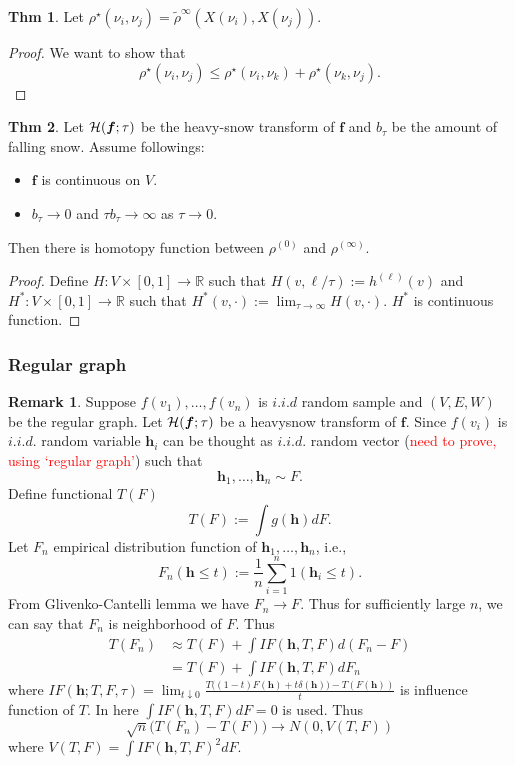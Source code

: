 \documentclass[preprint, review, 12pt]{article}
\theoremstyle{definition}
\newtheorem{thm}{Thm}[section]
\newtheorem{rmk}{Remark}[section]
\theoremstyle{remark}
\begin{document}
\begin{thm} 
Let $\rho^{\star}(\nu_i,\nu_j)=\tilde \rho^{\infty}(X(\nu_i),X(\nu_j)).$ 
\end{thm}
\begin{proof}
We want to show that 
\[
\rho^{\star}(\nu_i,\nu_j)\leq \rho^{\star}(\nu_i,\nu_k)+\rho^{\star}(\nu_k,\nu_j).
\]
\end{proof}

\begin{thm}
Let ${\cal H}({\boldsymbol f};\tau)$ be the heavy-snow transform of ${\boldsymbol f}$ and $b_{\tau}$ be the amount of falling snow. Assume followings:
\begin{itemize}
	\item ${\boldsymbol f}$ is continuous on $V$. 
	\item $b_{\tau} \to 0$ and $\tau b_\tau \to \infty$ as $\tau \to 0$.
\end{itemize}
Then there is homotopy function between $\rho^{(0)}$ and $\rho^{(\infty)}$. 
\end{thm}
\begin{proof}
Define $H:V \times [0,1] \to \mathbb{R}$ such that $H(v,\ell/\tau):=h^{(\ell)}(v)$ and $H^*:V \times [0,1] \to \mathbb{R}$ such that $H^*(v,\cdot):=\lim_{\tau \to \infty} H(v,\cdot)$. $H^*$ is continuous function. 
\end{proof}
\subsubsection{Regular graph}
\begin{rmk}
Suppose $f(v_1),\dots,f(v_n)$ is $i.i.d$ random sample and $(V,E,W)$ be the regular graph. Let ${\cal H}(\boldsymbol{f};\tau)$ be a heavysnow transform of ${\boldsymbol f}$. Since $f(v_i)$ is $i.i.d.$ random variable ${\boldsymbol h}_i$ can be thought as $i.i.d.$ random vector (\textcolor{red}{need to prove, using `regular graph'}) such that 
\[
{\boldsymbol h}_1,\dots,{\boldsymbol h}_n \sim F.
\] 
Define functional $T(F)$
\[
T(F):=\int g({\boldsymbol h}) dF.
\]
Let $F_n$ empirical distribution function of ${\boldsymbol h}_1,\dots,{\boldsymbol h}_n$, i.e., 
\[
F_n({\boldsymbol h}\leq t ) :=\frac{1}{n}\sum_{i=1}^{n}1({\boldsymbol h}_i\leq t).
\]
From Glivenko-Cantelli lemma we have $F_n \to F$. Thus for sufficiently large $n$, we can say that $F_n$ is neighborhood of $F$. Thus 
\begin{align*}
T(F_n) & \approx  T(F)+\int IF(\boldsymbol{h},T,F)d(F_n-F) \\
& = T(F)+\int IF(\boldsymbol{h},T,F) dF_n
\end{align*}
where $IF({\boldsymbol h}; T,F,\tau)= \lim_{t\downarrow 0}\frac{T\big((1-t)F(\boldsymbol{h}) + t \delta(\boldsymbol{h}) \big)-T(F(\boldsymbol{h}))}{t}$ is influence function of $T$. In here $\int IF(\boldsymbol{h},T,F)dF=0$ is used. Thus 
\[
\sqrt{n}\Big(T(F_n)-T(F) \Big) \to N(0,V(T,F))
\]
where $V(T,F)=\int IF(\boldsymbol{h},T,F)^2 dF$.
\end{rmk}
\end{document}
